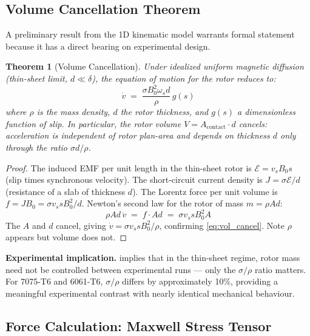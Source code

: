 \documentclass[12pt,letterpaper]{article}
\newtheorem{theorem}{Theorem}
\begin{document}
\subsection{Volume Cancellation Theorem}
\label{sec:vol_cancel}

A preliminary result from the 1D kinematic model warrants formal statement because it
has a direct bearing on experimental design.

\begin{theorem}[Volume Cancellation]
\label{thm:vol_cancel}
Under idealized uniform magnetic diffusion (thin-sheet limit, $d \ll \delta$),
the equation of motion for the rotor reduces to:
\begin{equation}
  \dot{v} \;=\; \frac{\sigma B_0^2 \omega_s d}{\rho}\,g(s)
  \label{eq:vol_cancel}
\end{equation}
where $\rho$ is the mass density, $d$ the rotor thickness, and $g(s)$ a dimensionless
function of slip. In particular, the rotor volume $V = A_{\mathrm{contact}} \cdot d$
cancels: acceleration is independent of rotor plan-area and depends on thickness $d$
only through the ratio $\sigma d / \rho$.
\end{theorem}

\begin{proof}
The induced EMF per unit length in the thin-sheet rotor is $\mathcal{E} = v_s B_0 s$
(slip times synchronous velocity). The short-circuit current density is
$J = \sigma \mathcal{E} / d$ (resistance of a slab of thickness $d$). The Lorentz
force per unit volume is $f = J B_0 = \sigma v_s s B_0^2 / d$. Newton's second law
for the rotor of mass $m = \rho A d$:
\[
  \rho A d\, \dot{v} \;=\; f \cdot A d \;=\; \sigma v_s s B_0^2 A
\]
The $A$ and $d$ cancel, giving $\dot{v} = \sigma v_s s B_0^2 / \rho$,
confirming \cref{eq:vol_cancel}. Note $\rho$ appears but volume does not. \end{proof}

\textbf{Experimental implication.}  implies that in the thin-sheet
regime, rotor mass need not be controlled between experimental runs — only the
$\sigma/\rho$ ratio matters. For 7075-T6 and 6061-T6, $\sigma/\rho$ differs by
approximately 10\%, providing a meaningful experimental contrast with nearly identical
mechanical behaviour.

\subsection{Force Calculation: Maxwell Stress Tensor}
\label{sec:mst}
\end{document}
